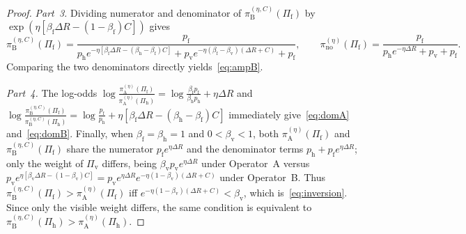 \documentclass[11pt,a4paper]{article}
\begin{document}
\begin{proof}
\emph{Part~3.} Dividing numerator and denominator of $\pi_{\mathrm{B}}^{(\eta, C)}(\Pi_{\mathrm{f}})$ by $\exp(\eta[\beta_{\mathrm{f}}\Delta R - (1-\beta_{\mathrm{f}})C])$ gives
\[
  \pi_{\mathrm{B}}^{(\eta, C)}(\Pi_{\mathrm{f}})
  = \frac{p_{\mathrm{f}}}{p_{\mathrm{h}} e^{-\eta[\beta_{\mathrm{f}}\Delta R - (\beta_{\mathrm{h}}-\beta_{\mathrm{f}})C]} + p_{\mathrm{v}} e^{-\eta(\beta_{\mathrm{f}}-\beta_{\mathrm{v}})(\Delta R + C)} + p_{\mathrm{f}}},
  \qquad
  \pi_{\mathrm{no}}^{(\eta)}(\Pi_{\mathrm{f}})
  = \frac{p_{\mathrm{f}}}{p_{\mathrm{h}} e^{-\eta \Delta R} + p_{\mathrm{v}} + p_{\mathrm{f}}}.
\]
Comparing the two denominators directly yields~\eqref{eq:ampB}.

\emph{Part~4.} The log-odds $\log\frac{\pi_{\mathrm{A}}^{(\eta)}(\Pi_{\mathrm{f}})}{\pi_{\mathrm{A}}^{(\eta)}(\Pi_{\mathrm{h}})} = \log\frac{\beta_{\mathrm{f}} p_{\mathrm{f}}}{\beta_{\mathrm{h}} p_{\mathrm{h}}} + \eta\Delta R$ and $\log\frac{\pi_{\mathrm{B}}^{(\eta, C)}(\Pi_{\mathrm{f}})}{\pi_{\mathrm{B}}^{(\eta, C)}(\Pi_{\mathrm{h}})} = \log\frac{p_{\mathrm{f}}}{p_{\mathrm{h}}} + \eta[\beta_{\mathrm{f}}\Delta R - (\beta_{\mathrm{h}} - \beta_{\mathrm{f}})C]$ immediately give~\eqref{eq:domA} and~\eqref{eq:domB}. Finally, when $\beta_{\mathrm{f}} = \beta_{\mathrm{h}} = 1$ and $0 < \beta_{\mathrm{v}} < 1$, both $\pi_{\mathrm{A}}^{(\eta)}(\Pi_{\mathrm{f}})$ and $\pi_{\mathrm{B}}^{(\eta, C)}(\Pi_{\mathrm{f}})$ share the numerator $p_{\mathrm{f}} e^{\eta \Delta R}$ and the denominator terms $p_{\mathrm{h}} + p_{\mathrm{f}} e^{\eta \Delta R}$; only the weight of $\Pi_{\mathrm{v}}$ differs, being $\beta_{\mathrm{v}} p_{\mathrm{v}} e^{\eta \Delta R}$ under Operator~A versus $p_{\mathrm{v}} e^{\eta[\beta_{\mathrm{v}}\Delta R - (1-\beta_{\mathrm{v}})C]} = p_{\mathrm{v}} e^{\eta \Delta R} e^{-\eta(1-\beta_{\mathrm{v}})(\Delta R + C)}$ under Operator~B. Thus $\pi_{\mathrm{B}}^{(\eta, C)}(\Pi_{\mathrm{f}}) > \pi_{\mathrm{A}}^{(\eta)}(\Pi_{\mathrm{f}})$ iff $e^{-\eta(1-\beta_{\mathrm{v}})(\Delta R + C)} < \beta_{\mathrm{v}}$, which is~\eqref{eq:inversion}. Since only the visible weight differs, the same condition is equivalent to $\pi_{\mathrm{B}}^{(\eta, C)}(\Pi_{\mathrm{h}}) > \pi_{\mathrm{A}}^{(\eta)}(\Pi_{\mathrm{h}})$.
\end{proof}
\end{document}
